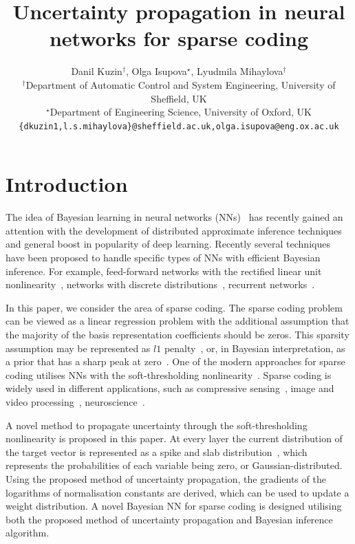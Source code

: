 \documentclass{article}
\title{Uncertainty propagation in neural networks for sparse coding}
\author{
Danil Kuzin$^{\dagger}$, Olga Isupova$^{\star}$, Lyudmila Mihaylova$^{\dagger}$\\
$^{\dagger}$Department of Automatic Control
and System Engineering,
University of Sheffield, UK \\ 
$^{\star}$Department of Engineering Science,
University of Oxford, UK \\
\texttt{\{dkuzin1,l.s.mihaylova\}@sheffield.ac.uk,olga.isupova@eng.ox.ac.uk}
}
\begin{document}
\maketitle
\section{Introduction}
  The idea of Bayesian learning in neural networks (NNs)~\cite{neal2012bayesian} has recently gained an attention with the development of distributed approximate inference techniques~\cite{li2015stochastic, hoffman2013stochastic} and general boost in popularity of deep learning. Recently several techniques~\cite{ranganath2015deep, gal2016dropout} have been proposed to handle specific types of NNs with efficient Bayesian inference. For example, feed-forward networks with the rectified linear unit nonlinearity~\cite{hernandez2015probabilistic}, networks with discrete distributions~\cite{soudry2014expectation}, recurrent networks~\cite{mcdermott2017bayesian}.

  In this paper, we consider the area of sparse coding. The sparse coding problem can be viewed as a linear regression problem with the additional assumption that the majority of the basis representation coefficients should be zeros. This sparsity assumption may be represented as $l1$ penalty~\cite{tibshirani1996regression}, or, in Bayesian interpretation, as a prior that has a sharp peak at zero~\cite{tipping2001sparse}. One of the modern approaches for sparse coding utilises NNs with the soft-thresholding nonlinearity~\cite{gregor2010learning, sprechmann2015learning}. Sparse coding is widely used in different applications, such as compressive sensing~\cite{candes2008introduction}, image and video processing~\cite{mairal2014sparse, wang2015deep}, neuroscience~\cite{baillet1997bayesian, jas2017learning}.

  A novel method to propagate uncertainty through the soft-thresholding nonlinearity is proposed in this paper. At every layer the current distribution of the target vector is represented as a spike and slab distribution~\cite{mitchell1988bayesian}, which represents the probabilities of each variable being zero, or Gaussian-distributed. Using the proposed method of uncertainty propagation, the gradients of the logarithms of normalisation constants are derived, which can be used to update a weight distribution. A novel Bayesian NN for sparse coding is designed utilising both the proposed method of uncertainty propagation and Bayesian inference algorithm.
\end{document}
